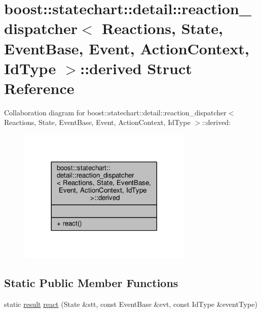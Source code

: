 \hypertarget{structboost_1_1statechart_1_1detail_1_1reaction__dispatcher_1_1derived}{}\section{boost\+:\+:statechart\+:\+:detail\+:\+:reaction\+\_\+dispatcher$<$ Reactions, State, Event\+Base, Event, Action\+Context, Id\+Type $>$\+:\+:derived Struct Reference}
\label{structboost_1_1statechart_1_1detail_1_1reaction__dispatcher_1_1derived}


Collaboration diagram for boost\+:\+:statechart\+:\+:detail\+:\+:reaction\+\_\+dispatcher$<$ Reactions, State, Event\+Base, Event, Action\+Context, Id\+Type $>$\+:\+:derived\+:
\nopagebreak
\begin{figure}[H]
\begin{center}
\leavevmode
\includegraphics[width=236pt]{structboost_1_1statechart_1_1detail_1_1reaction__dispatcher_1_1derived__coll__graph}
\end{center}
\end{figure}
\subsection*{Static Public Member Functions}
\begin{DoxyCompactItemize}
\item 
static \mbox{\hyperlink{namespaceboost_1_1statechart_abe807f6598b614d6d87bb951ecd92331}{result}} \mbox{\hyperlink{structboost_1_1statechart_1_1detail_1_1reaction__dispatcher_1_1derived_a6e2921ea9b17c87e6670ed9a4dd11e7b}{react}} (State \&stt, const Event\+Base \&evt, const Id\+Type \&event\+Type)
\end{DoxyCompactItemize}


